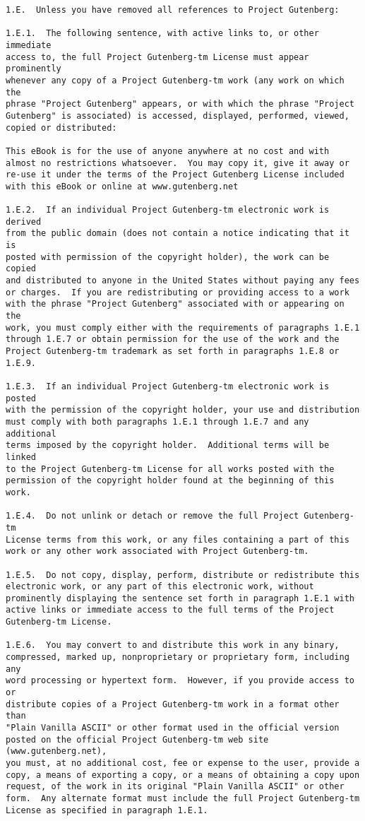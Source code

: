\documentclass[oneside,12pt]{book}
\begin{document}
\begin{verbatim}
1.E.  Unless you have removed all references to Project Gutenberg:

1.E.1.  The following sentence, with active links to, or other immediate
access to, the full Project Gutenberg-tm License must appear prominently
whenever any copy of a Project Gutenberg-tm work (any work on which the
phrase "Project Gutenberg" appears, or with which the phrase "Project
Gutenberg" is associated) is accessed, displayed, performed, viewed,
copied or distributed:

This eBook is for the use of anyone anywhere at no cost and with
almost no restrictions whatsoever.  You may copy it, give it away or
re-use it under the terms of the Project Gutenberg License included
with this eBook or online at www.gutenberg.net

1.E.2.  If an individual Project Gutenberg-tm electronic work is derived
from the public domain (does not contain a notice indicating that it is
posted with permission of the copyright holder), the work can be copied
and distributed to anyone in the United States without paying any fees
or charges.  If you are redistributing or providing access to a work
with the phrase "Project Gutenberg" associated with or appearing on the
work, you must comply either with the requirements of paragraphs 1.E.1
through 1.E.7 or obtain permission for the use of the work and the
Project Gutenberg-tm trademark as set forth in paragraphs 1.E.8 or
1.E.9.

1.E.3.  If an individual Project Gutenberg-tm electronic work is posted
with the permission of the copyright holder, your use and distribution
must comply with both paragraphs 1.E.1 through 1.E.7 and any additional
terms imposed by the copyright holder.  Additional terms will be linked
to the Project Gutenberg-tm License for all works posted with the
permission of the copyright holder found at the beginning of this work.

1.E.4.  Do not unlink or detach or remove the full Project Gutenberg-tm
License terms from this work, or any files containing a part of this
work or any other work associated with Project Gutenberg-tm.

1.E.5.  Do not copy, display, perform, distribute or redistribute this
electronic work, or any part of this electronic work, without
prominently displaying the sentence set forth in paragraph 1.E.1 with
active links or immediate access to the full terms of the Project
Gutenberg-tm License.

1.E.6.  You may convert to and distribute this work in any binary,
compressed, marked up, nonproprietary or proprietary form, including any
word processing or hypertext form.  However, if you provide access to or
distribute copies of a Project Gutenberg-tm work in a format other than
"Plain Vanilla ASCII" or other format used in the official version
posted on the official Project Gutenberg-tm web site (www.gutenberg.net),
you must, at no additional cost, fee or expense to the user, provide a
copy, a means of exporting a copy, or a means of obtaining a copy upon
request, of the work in its original "Plain Vanilla ASCII" or other
form.  Any alternate format must include the full Project Gutenberg-tm
License as specified in paragraph 1.E.1.


\end{verbatim}
\end{document}
